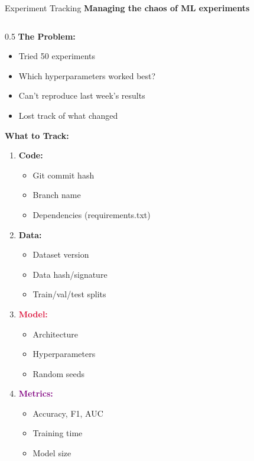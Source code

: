 \begin{frame}{Experiment Tracking}
\textbf{Managing the chaos of ML experiments}

\begin{columns}
\begin{column}{0.5\textwidth}
\textbf{The Problem:}

\begin{itemize}
\item Tried 50 experiments
\item Which hyperparameters worked best?
\item Can't reproduce last week's results
\item Lost track of what changed
\end{itemize}

\vspace{0.3cm}

\textbf{What to Track:}

\begin{enumerate}
\item \textcolor{forest}{\textbf{Code:}}
   \begin{itemize}
   \item Git commit hash
   \item Branch name
   \item Dependencies (requirements.txt)
   \end{itemize}

\item \textcolor{navyblue}{\textbf{Data:}}
   \begin{itemize}
   \item Dataset version
   \item Data hash/signature
   \item Train/val/test splits
   \end{itemize}

\item \textcolor{crimson}{\textbf{Model:}}
   \begin{itemize}
   \item Architecture
   \item Hyperparameters
   \item Random seeds
   \end{itemize}

\item \textcolor{purple}{\textbf{Metrics:}}
   \begin{itemize}
   \item Accuracy, F1, AUC
   \item Training time
   \item Model size
   \end{itemize}
\end{enumerate}
\end{column}


\end{columns}
\end{frame}
